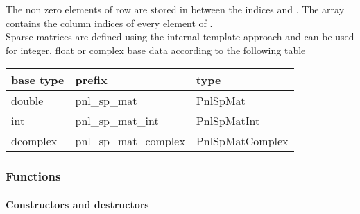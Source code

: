 The non zero elements of row  are stored in  between the
indices  and . The array  contains the column
indices of every element of .
\\

Sparse matrices are defined using the internal template approach and can be used
for integer, float or complex base data according to the following table
\begin{center}
  \begin{tabular}[t]{lll}
    base type & prefix & type \\
    \hline
    double & pnl_sp_mat & PnlSpMat \\
    \hline
    int & pnl_sp_mat_int & PnlSpMatInt \\
    \hline
    dcomplex & pnl_sp_mat_complex & PnlSpMatComplex
  \end{tabular}
\end{center}

\subsubsection{Functions}

\paragraph{Constructors and destructors}


